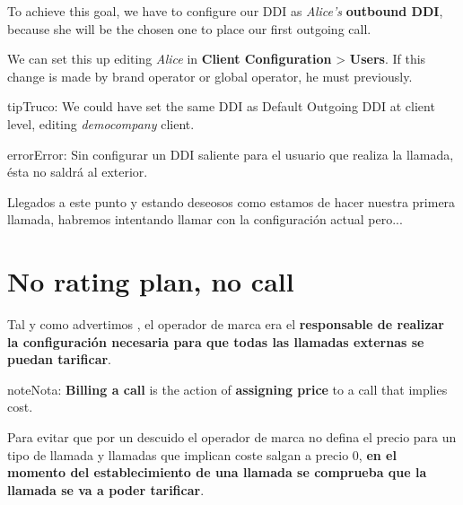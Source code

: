 \documentclass[letterpaper,10pt,spanish]{sphinxmanual}
\begin{document}
To achieve this goal, we have to configure our DDI as \emph{Alice's} \textbf{outbound DDI},
because she will be the chosen one to place our first outgoing call.

We can set this up editing \emph{Alice} in \textbf{Client Configuration} \textgreater{} \textbf{Users}. If
this change is made by brand operator or global operator, he must {\hyperref[getting_started/internal_calls/brand_portal:emulate\string-client]{}} previously.

\begin{notice}{tip}{Truco:}
We could have set the same DDI as Default Outgoing DDI at client level, editing \emph{democompany} client.
\end{notice}

\begin{notice}{error}{Error:}
Sin configurar un DDI saliente para el usuario que realiza la llamada, ésta no saldrá al exterior.
\end{notice}

Llegados a este punto y estando deseosos como estamos de hacer nuestra primera llamada, habremos intentando llamar con la configuración actual pero...


\section{No rating plan, no call}
\label{getting_started/external_outgoing_calls/noplan_nocall:no-rating-plan-no-call}\label{getting_started/external_outgoing_calls/noplan_nocall:noplan-nocall}\label{getting_started/external_outgoing_calls/noplan_nocall::doc}
Tal y como advertimos {\hyperref[basic_concepts/operation_roles/index:brand\string-responsibilities]{}}, el operador de marca era el \textbf{responsable de realizar la configuración necesaria para que todas las llamadas externas se puedan tarificar}.

\begin{notice}{note}{Nota:}
\textbf{Billing a call} is the action of \textbf{assigning price} to a call that implies
cost.
\end{notice}

Para evitar que por un descuido el operador de marca no defina el precio para un tipo de llamada y llamadas que implican coste salgan a precio 0, \textbf{en el momento del establecimiento de una llamada se comprueba que la llamada se va a poder tarificar}.
\end{document}
